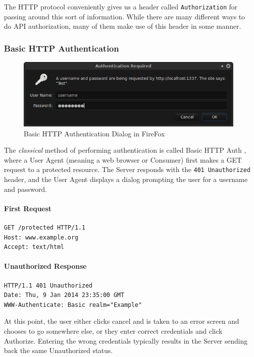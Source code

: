 \documentclass{book}
\begin{document}
The HTTP protocol conveniently gives us a header called \texttt{Authorization} for passing around this sort of information. While there are many different ways to do API authorization, many of them make use of this header in some manner.

\subsubsection{Basic HTTP Authentication}

\begin{figure}[ht!]
\centering
\includegraphics[width=140mm]{images/basic-http-auth.png}
\caption{Basic HTTP Authentication Dialog in FireFox}
\label{fig:basichhtpauth}
\end{figure}

The \emph{classical} method of performing authentication is called Basic HTTP Auth \cite{RFC2617}, where a User Agent (meaning a web browser or Consumer) first makes a GET request to a protected resource. The Server responds with the \texttt{401 Unauthorized} header, and the User Agent displays a dialog prompting the user for a username and password.

\paragraph{\textbf{First Request}}

\begin{verbatim}
GET /protected HTTP/1.1
Host: www.example.org
Accept: text/html
\end{verbatim}

\paragraph{\textbf{Unauthorized Response}}

\begin{verbatim}
HTTP/1.1 401 Unauthorized
Date: Thu, 9 Jan 2014 23:35:00 GMT
WWW-Authenticate: Basic realm="Example"
\end{verbatim}

At this point, the user either clicks cancel and is taken to an error screen and chooses to go somewhere else, or they enter correct credentials and click Authorize. Entering the wrong credentials typically results in the Server sending back the same Unauthorized status.
\end{document}
